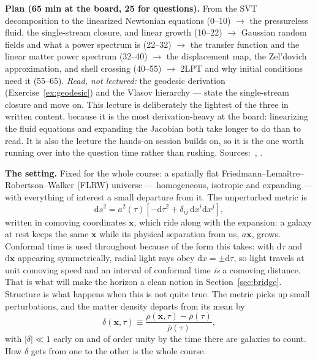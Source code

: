 \documentclass[a4paper,11pt]{article}
\newcommand{\vx}{\bm{x}}
\newcommand{\dd}{\mathrm{d}}
\numberwithin{equation}{section}
\begin{document}
\noindent\textbf{Plan (65 min at the board, 25 for questions).} From the SVT decomposition to the linearized Newtonian equations (0--10) $\rightarrow$ the pressureless fluid, the single-stream closure, and linear growth (10--22) $\rightarrow$ Gaussian random fields and what a power spectrum is (22--32) $\rightarrow$ the transfer function and the linear matter power spectrum (32--40) $\rightarrow$ the displacement map, the Zel'dovich approximation, and shell crossing (40--55) $\rightarrow$ 2LPT and why initial conditions need it (55--65). \emph{Read, not lectured:} the geodesic derivation (Exercise~\ref{ex:geodesic}) and the Vlasov hierarchy --- state the single-stream closure and move on. This lecture is deliberately the lightest of the three in written content, because it is the most derivation-heavy at the board: linearizing the fluid equations and expanding the Jacobian both take longer to do than to read. It is also the lecture the hands-on session builds on, so it is the one worth running over into the question time rather than rushing. Sources:~\cite{MaBertschinger1995,Bernardeau2002}, \cite[Apps.~A and E]{Jeong2010}.

\medskip
\noindent\textbf{The setting.} Fixed for the whole course: a spatially flat
Friedmann--Lema\^itre--Robertson--Walker (FLRW) universe --- homogeneous,
isotropic and expanding --- with everything of interest a small departure from
it. The unperturbed metric is
\begin{equation*}
\dd s^2 = a^2(\tau)\left[-\dd\tau^2 + \delta_{ij}\,\dd x^i\dd x^j\right],
\end{equation*}
written in comoving coordinates $\vx$, which ride along with the expansion: a
galaxy at rest keeps the same $\vx$ while its physical separation from us,
$a\vx$, grows. Conformal time is used throughout because of the form this takes:
with $\dd\tau$ and $\dd\vx$ appearing symmetrically, radial light rays obey
$\dd x = \pm\dd\tau$, so light travels at unit comoving speed and an interval of
conformal time \emph{is} a comoving distance. That is what will make the horizon
a clean notion in Section~\ref{sec:bridge}. Structure is what happens when this is not quite true. The metric
picks up small perturbations, and the matter density departs from its mean by
\begin{equation*}
\delta(\vx,\tau) \equiv \frac{\rho(\vx,\tau) - \bar\rho(\tau)}{\bar\rho(\tau)} ,
\end{equation*}
with $|\delta|\ll1$ early on and of order unity by the time there are galaxies to
count. How $\delta$ gets from one to the other is the whole course.
\end{document}
